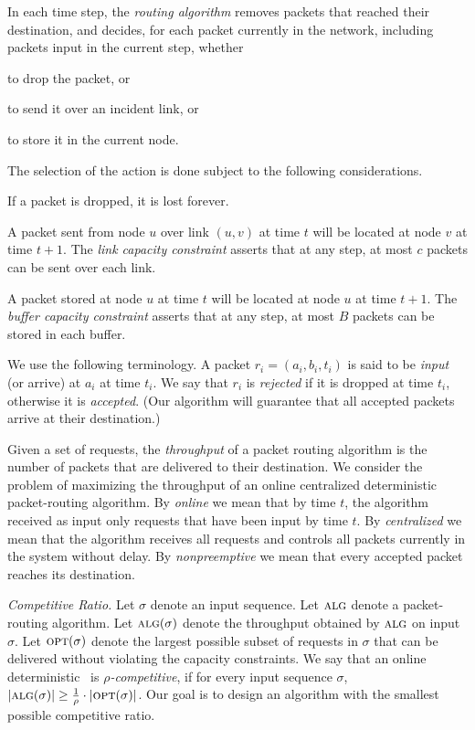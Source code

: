\documentclass[11pt]{article}
\newcommand{\opt}{\text{\textsc{opt}}}
\newcommand{\alg}{\text{\sc{alg}}}
\newenvironment{proof sketch}[1]{\noindent {\emph{Proof sketch of #1:}}}{\hfill \qed}
\begin{document}
In each time step, the \emph{routing algorithm} removes packets that
reached their destination, and  decides, for each
packet currently in the network, including
packets input in the current
step, whether
\begin{inparaenum}[(i)]
\item to drop the packet, or
\item to send it over an incident link, or
\item to store it in the current node.
\end{inparaenum}
The selection of the action is done subject to the following
considerations.
\begin{compactitem}
\item If a packet is dropped, it is lost forever.
\item A packet sent from node $u$ over link $(u,v)$ at time $t$ will
  be located at node $v$ at time $t+1$. The \emph{link capacity constraint} asserts that at any step,
  at most $c$ packets can be sent over each link.
\item A packet stored at node $u$ at time $t$ will
  be located at node $u$ at time $t+1$. The \emph{buffer capacity
    constraint} asserts that at any step,
  at most $B$ packets can be stored in each buffer.
\end{compactitem}
We use the following terminology.  A packet
$r_i=(a_i,b_i,t_i)$ is said to be \emph{input} (or arrive)
at $a_i$ at time $t_i$. We say that $r_i$ is
\emph{rejected} if it is dropped at time $t_i$, otherwise
it is \emph{accepted}. (Our algorithm will guarantee that
all accepted packets arrive at their destination.)

Given a set of requests, the \emph{throughput} of a packet routing
algorithm is the number of
packets that are delivered to their destination.  We consider the
problem of maximizing the throughput of an online centralized
deterministic packet-routing algorithm.
By \emph{online} we mean that by time $t$, the algorithm received as
input only requests that have been input by time $t$.
By \emph{centralized} we mean that the algorithm receives
all
requests and controls all  packets currently in the system without delay.
By \emph{nonpreemptive} we mean that every accepted packet reaches its
destination.








\emph{Competitive Ratio.}
Let $\sigma$ denote an input sequence. Let $\alg$ denote a
packet-routing algorithm.  Let $\alg(\sigma)$ denote the throughput obtained by $\alg$ on input $\sigma$. Let $\opt(\sigma)$ denote the largest possible subset of
requests in $\sigma$ that can be delivered without
violating the capacity constraints. We say that an online
deterministic \alg\ is \emph{$\rho$-competitive}, if for
every input sequence $\sigma$, $|\alg(\sigma)| \geq \frac
1\rho \cdot |\opt(\sigma)|$. Our goal is to design an
algorithm with the smallest possible competitive ratio.
\end{document}

